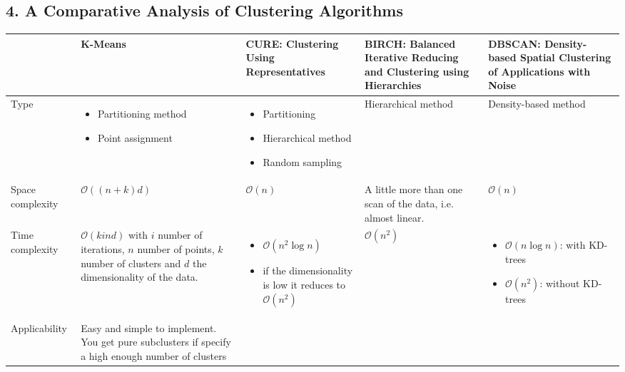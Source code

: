 \documentclass[11pt,a4paper]{article}
\begin{document}
\begin{landscape}
\subsection*{4. A Comparative Analysis of Clustering Algorithms}
\begin{table}[H]
\def\arraystretch{1.2}
\begin{tabular}{p{2cm}||p{5.5cm}|p{5.5cm}|p{5.5cm}|p{5.5cm}}
&K-Means&CURE: Clustering Using Representatives& BIRCH: Balanced Iterative Reducing and Clustering using Hierarchies & DBSCAN: Density-based Spatial Clustering of Applications with Noise \\
\hline
\hline Type &
\vspace{-\topsep}
\begin{itemize}
\itemsep0em
\item Partitioning method
\item Point assignment
\end{itemize}
& 
\vspace{-\topsep}
\begin{itemize}
\itemsep0em
\item Partitioning
\item Hierarchical method
\item Random sampling
\end{itemize}

&
Hierarchical method
&
Density-based method\\


\hline
Space complexity
&
$\mathcal{O}((n+k)d)$
&
$\mathcal{O}(n)$&A little more than one scan of the data, i.e. almost linear.
&$\mathcal{O}(n)$\\


\hline Time complexity
&$\mathcal{O}(kind)$ with $i$ number of iterations, $n$ number of points, $k$ number of clusters and $d$ the dimensionality of the data. 

&
\vspace{-\topsep}
\begin{itemize}
\itemsep0em
\item $\mathcal{O}(n^2\log{n})$ 
\item if the dimensionality is low it reduces to $\mathcal{O}(n^2)$
\end{itemize}
&
$\mathcal{O}(n^2)$
&
\vspace{-\topsep}
\begin{itemize}
\itemsep0em
\item $\mathcal{O}(n\log{n})$: with KD-trees
\item $\mathcal{O}(n^2)$: without KD-trees
\end{itemize}
\\
\hline
Applicability&
Easy and simple to implement. You get pure subclusters if specify a high enough number of clusters


\end{tabular}
\end{table}
\end{landscape}
\end{document}
